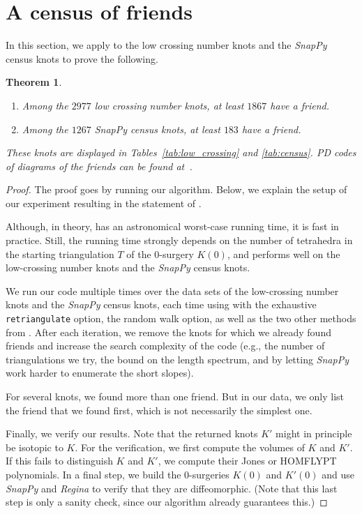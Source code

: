 \documentclass{amsart} %
\theoremstyle{thm}
\newtheorem{thm}[Theorem]{Theorem}
\theoremstyle{definition}
\numberwithin{equation}{section}
\begin{document}
\section{A census of friends}\label{sec:census}

In this section, we apply  to the low crossing number knots and the {\em SnapPy} census knots to prove the following.

\begin{thm}\label{thm:census_friends}\hfill
\begin{enumerate}
    \item Among the $2977$ low crossing number knots, at least $1867$ have a friend.
    \item Among the $1267$ {\em SnapPy} census knots, at least $ 183$ have a friend.
\end{enumerate}
These knots are displayed in Tables~\ref{tab:low_crossing} and \ref{tab:census}. PD codes of diagrams of the friends can be found at~\cite{data}.
\end{thm}

\begin{proof}
    The proof goes by running our algorithm. Below, we explain the setup of our experiment resulting in the statement of .

    Although, in theory,  has an astronomical worst-case running time, it is fast in practice. Still, the running time strongly depends on the number of tetrahedra in the starting triangulation $T$ of the $0$-surgery $K(0)$, and performs well on the low-crossing number knots and the {\em SnapPy} census knots.

    We run our code multiple times over the data sets of the low-crossing number knots and the {\em SnapPy} census knots, each time using  with the exhaustive \texttt{retriangulate} option, the random walk option, as well as the two other methods from . After each iteration, we remove the knots for which we already found friends and increase the search complexity of the code (e.g., the number of triangulations we try, the bound on the length spectrum, and by letting {\em SnapPy} work harder to enumerate the short slopes). 

    For several knots, we found more than one friend. But in our data, we only list the friend that we found first, which is not necessarily the simplest one.

    Finally, we verify our results. Note that the returned knots $K'$ might in principle be isotopic to $K$. For the verification, we first compute the volumes of $K$ and $K'$. If this fails to distinguish $K$ and $K'$, we compute their Jones or HOMFLYPT polynomials. In a final step, we build the $0$-surgeries $K(0)$ and $K'(0)$ and use {\em SnapPy} and {\em Regina} to verify that they are diffeomorphic. (Note that this last step is only a sanity check, since our algorithm already guarantees this.)
\end{proof}
\end{document}
